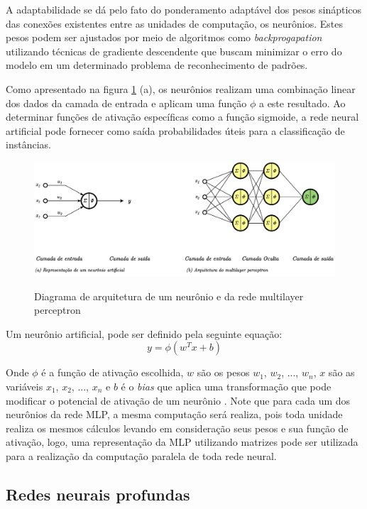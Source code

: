A adaptabilidade se dá pelo fato do ponderamento adaptável dos pesos sinápticos das conexões existentes entre as unidades de computação, os neurônios. Estes pesos podem ser ajustados por meio de algoritmos como \textit{backprogapation} utilizando técnicas de gradiente descendente que buscam minimizar o erro do modelo em um determinado problema de reconhecimento de padrões.

Como apresentado na figura \ref{fig:perceptron} (a), os neurônios realizam uma combinação linear dos dados da camada de entrada e aplicam uma função $\phi$ a este resultado. Ao determinar funções de ativação específicas como a função sigmoide, a rede neural artificial pode fornecer como saída probabilidades úteis para a classificação de instâncias.

\begin{figure}[htbp]
	\centering
	\caption{Diagrama de arquitetura de um neurônio e da rede multilayer perceptron}
		\includegraphics[scale=.25]{imagens/perceptron.png}
	\label{fig:perceptron}
\end{figure}

Um neurônio artificial, pode ser definido pela seguinte equação:
\begin{equation}
    y = \phi(w^{T}x + b)
\end{equation}

Onde $\phi$ é a função de ativação escolhida, $w$ são os pesos $w_1$, $w_2$, ..., $w_n$, $x$ são as variáveis $x_1$, $x_2$, ..., $x_n$ e $b$ é o \textit{bias} que aplica uma transformação que pode modificar o potencial de ativação de um neurônio \cite{haykinNeuralNetworksLearning2009}. Note que para cada um dos neurônios da rede MLP, a mesma computação será realiza, pois toda unidade realiza os mesmos cálculos levando em consideração seus pesos e sua função de ativação, logo, uma representação da MLP utilizando matrizes pode ser utilizada para a realização da computação paralela de toda rede neural.

\subsection{Redes neurais profundas}

